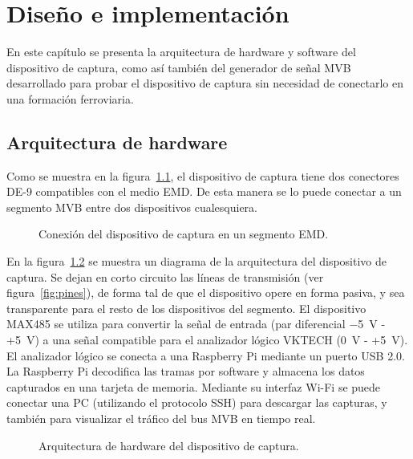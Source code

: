 \chapter{Diseño e implementación}
\label{cap:DisenioImplementacion}

En este capítulo se presenta la arquitectura de hardware y software del dispositivo de captura, como así también del generador de señal MVB desarrollado para probar el dispositivo de captura sin necesidad de conectarlo en una formación ferroviaria.

\section{Arquitectura de hardware}
\label{sec:hardware}

Como se muestra en la figura~\ref{fig:conexion}, el dispositivo de captura tiene dos conectores DE-9 compatibles con el medio EMD. De esta manera se lo puede conectar a un segmento MVB entre dos dispositivos cualesquiera.

\begin{figure}[htbp]
	\centering
    {
        \fontsize{8pt}{8pt}\selectfont
        
    }
	\caption{Conexión del dispositivo de captura en un segmento EMD.}
    \label{fig:conexion}
\end{figure}

En la figura~\ref{fig:bloques} se muestra un diagrama de la arquitectura del dispositivo de captura.
Se dejan en corto circuito las líneas de transmisión (ver figura~\ref{fig:pines}), de forma tal de que el dispositivo opere en forma pasiva, y sea transparente para el resto de los dispositivos del segmento.
El dispositivo MAX485 \cite{max485} se utiliza para convertir la señal de entrada (par diferencial $-$5~V - +5~V) a una señal compatible para el analizador lógico VKTECH (0~V - +5~V). El analizador lógico se conecta a una Raspberry Pi mediante un puerto USB 2.0. La Raspberry Pi decodifica las tramas por software y almacena los datos capturados en una tarjeta de memoria. Mediante su interfaz Wi-Fi se puede conectar una PC (utilizando el protocolo SSH) para descargar las capturas, y también para visualizar el tráfico del bus MVB en tiempo real.

\begin{figure}[htbp]
	\centering
    {
        \fontsize{8pt}{8pt}\selectfont
        
    }
	\caption{Arquitectura de hardware del dispositivo de captura.}
    \label{fig:bloques}
\end{figure}


